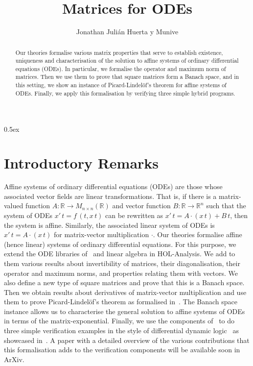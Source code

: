 \documentclass[11pt,a4paper]{article}
\begin{document}
\title{Matrices for ODEs}
\author{Jonathan Juli\'an Huerta y Munive}
\maketitle

\begin{abstract}
  Our theories formalise various matrix properties that serve to establish 
  existence, uniqueness and characterisation of the solution to affine 
  systems of ordinary differential equations (ODEs). In particular, we
  formalise the operator and maximum norm of matrices. Then we use 
  them to prove that square matrices form a Banach space, and in this 
  setting, we show an instance of Picard-Lindel\"of's theorem for affine
  systems of ODEs. Finally, we apply this formalisation by verifying three 
  simple hybrid programs.
\end{abstract}

\tableofcontents

\parindent 0pt\parskip 0.5ex

\section{Introductory Remarks}

Affine systems of ordinary differential equations (ODEs) are those whose associated vector fields are linear transformations. That is, if there is a matrix-valued function $A:\mathbb{R}\to M_{n\times n}(\mathbb{R})$ and vector function $B:\mathbb{R}\to\mathbb{R}^n$ such that the system of ODEs $x'\, t=f\, (t,x\, t)$ can be rewritten as $x'\, t=A\cdot (x\, t)+B\, t$, then the system is affine. Similarly, the associated linear system of ODEs is $x'\, t=A\cdot (x\, t)$ for matrix-vector multiplication $\cdot$. Our theories formalise affine (hence linear) systems of ordinary differential equations. For this purpose, we extend the ODE libraries of~\cite{ImmlerH12a} and linear algebra in HOL-Analysis. We add to them various results about invertibility of matrices, their diagonalisation, their operator and maximum norms, and properties relating them with vectors. We also define a new type of square matrices and prove that this is a Banach space. Then we obtain results about derivatives of matrix-vector multiplication and use them to prove Picard-Lindel\"of's theorem as formalised in~\cite{afp:hybrid}. The Banach space instance allows us to characterise the general solution to affine systems of ODEs in terms of the matrix-exponential. Finally, we use the components of~\cite{afp:hybrid} to do three simple verification examples in the style of differential dynamic logic~\cite{Platzer10} as showcased in~\cite{ArmstrongGS16,FosterMS19,MuniveS19}. A paper with a detailed overview of the various contributions that this formalisation adds to the verification components will be available soon in ArXiv.





\end{document}
